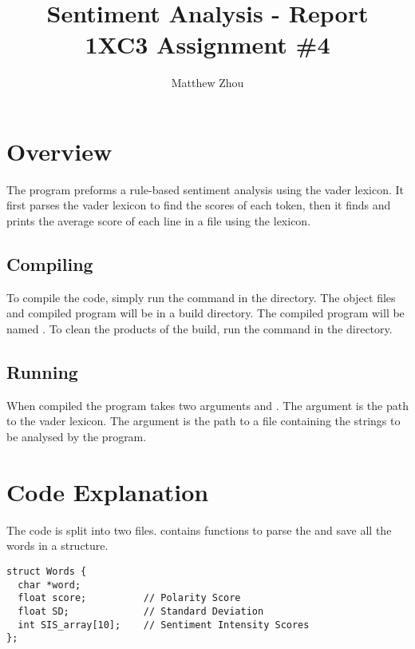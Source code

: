 \documentclass{article}
\title{Sentiment Analysis - Report \\ \vspace{0.2cm} \large 1XC3 Assignment \#4}
\author{Matthew Zhou}
\theoremstyle{mytheoremstyle}
\theoremstyle{mytheoremstyle}
\theoremstyle{myproblemstyle}
\begin{document}
    \maketitle

    \tableofcontents

    \section{Overview}

    The program preforms a rule-based sentiment analysis using the vader lexicon. It first parses the vader lexicon to find the scores of each token, then it finds and prints the average score of each line in a  file using the lexicon.

    \subsection{Compiling}
    To compile the code, simply run the  command in the  directory. The object files and compiled program will be in a build directory. The compiled program will be named . To clean the products of the build, run the  command in the  directory.

    \subsection{Running}
    When compiled the program takes two arguments  and . The  argument is the path to the vader lexicon. The  argument is the path to a  file containing the strings to be analysed by the program.

    \section{Code Explanation}

    The code is split into two files.  contains functions to parse the  and save all the words in a structure.

    \begin{lstlisting}
struct Words {
  char *word;
  float score;          // Polarity Score
  float SD;             // Standard Deviation
  int SIS_array[10];    // Sentiment Intensity Scores
};
    \end{lstlisting}
\end{document}
